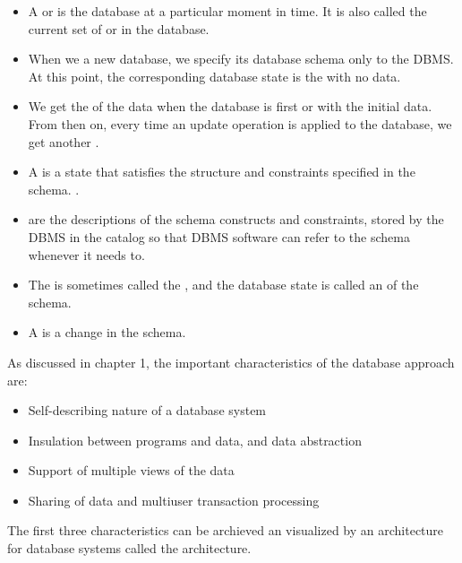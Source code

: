       \begin{itemize}
        \item A  or  is the database at a
          particular moment in time. It is also called the current set of
           or  in the database.
      \end{itemize}
    
      \begin{itemize}
        \item When we  a new database, we specify its database schema
          only to the DBMS. At this point, the corresponding database state is
          the  with no data.
        \item We get the  of the data when the database is
          first  or  with the initial data. From then
          on, every time an update operation is applied to the database, we get
          another .
        \item A  is a state that satisfies the structure and
          constraints specified in the schema. .
        \item {} are the descriptions of the schema constructs and
          constraints, stored by the DBMS in the catalog so that DBMS software
          can refer to the schema whenever it needs to.
        \item The  is sometimes called the , and the
          database state is called an  of the schema.
        \item A  is a change in the schema.
      \end{itemize}

  \par As discussed in chapter 1, the important characteristics of the database
    approach are:
    \begin{itemize}
      \item Self-describing nature of a database system
      \item Insulation between programs and data, and data abstraction
      \item Support of multiple views of the data
      \item Sharing of data and multiuser transaction processing
    \end{itemize}
  \par The first three characteristics can be archieved an visualized by an
  architecture for database systems called the  architecture.


